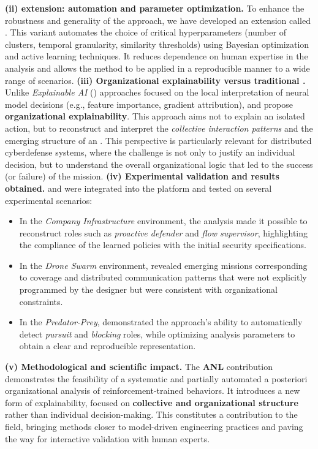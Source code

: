 \medskip
\noindent
\textbf{(ii)  extension: automation and parameter optimization.}
To enhance the robustness and generality of the approach, we have developed an extension called \textbf{}.
This variant automates the choice of critical hyperparameters (number of clusters, temporal granularity, similarity thresholds) using Bayesian optimization and active learning techniques.
It reduces dependence on human expertise in the analysis and allows the method to be applied in a reproducible manner to a wide range of scenarios.
\medskip
\noindent
\textbf{(iii) Organizational explainability versus traditional .}
Unlike \textit{Explainable AI} () approaches focused on the local interpretation of neural model decisions (e.g., feature importance, gradient attribution),  and  propose \textbf {organizational explainability}.
This approach aims not to explain an isolated action, but to reconstruct and interpret the \textit{collective interaction patterns} and the emerging structure of an .
This perspective is particularly relevant for distributed cyberdefense systems, where the challenge is not only to justify an individual decision, but to understand the overall organizational logic that led to the success (or failure) of the mission.
\medskip
\noindent
\textbf{(iv) Experimental validation and results obtained.}
 and  were integrated into the  platform and tested on several experimental scenarios:
\begin{itemize}
  \item In the \textit{Company Infrastructure} environment, the analysis made it possible to reconstruct roles such as \textit{proactive defender} and \textit{flow supervisor}, highlighting the compliance of the learned policies with the initial security specifications.

  \item In the \textit{Drone Swarm} environment,  revealed emerging missions corresponding to coverage and distributed communication patterns that were not explicitly programmed by the designer but were consistent with organizational constraints.
  \item In the \textit {Predator-Prey},  demonstrated the approach's ability to automatically detect \textit{pursuit} and \textit{blocking} roles, while optimizing analysis parameters to obtain a clear and reproducible representation.
\end{itemize}
\medskip
\noindent
\textbf{(v) Methodological and scientific impact.}
The \textbf{ANL} contribution demonstrates the feasibility of a systematic and partially automated a posteriori organizational analysis of reinforcement-trained  behaviors.
It introduces a new form of explainability, focused on \textbf{collective and organizational structure} rather than individual decision-making.
This constitutes a contribution to the field, bringing  methods closer to model-driven engineering practices and paving the way for interactive validation with human experts.
